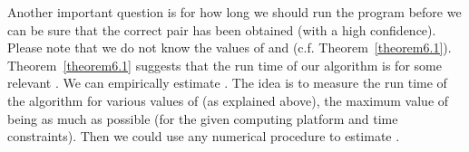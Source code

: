\documentclass{article}
\theoremstyle{definition}
\theoremstyle{remark}
\begin{document}
\begin{table}[ht]
\centering  {}
\vspace{0.2in}
\caption{No of pairs comparison on \protect\linebreak NOISE data set}\label{table5} \end{table}

\begin{table}[ht]
\centering  {}
\vspace{0.2in}
\caption{No of pairs comparison on \protect\linebreak synthetic data with injected pairs}\label{table6} \end{table}


 Another important question is for how long we should run the program before we can be sure that the correct pair has been obtained (with a high confidence). Please note that we do not know the values of  and  (c.f. Theorem~\ref{theorem6.1}). Theorem~\ref{theorem6.1} suggests that the run time of our algorithm is  for some relevant . We can empirically estimate . The idea is to measure the run time of the algorithm for various values of  (as explained above), the maximum value of  being as much as possible (for the given computing platform and time constraints). Then we could use any numerical procedure to estimate .
\end{document}
